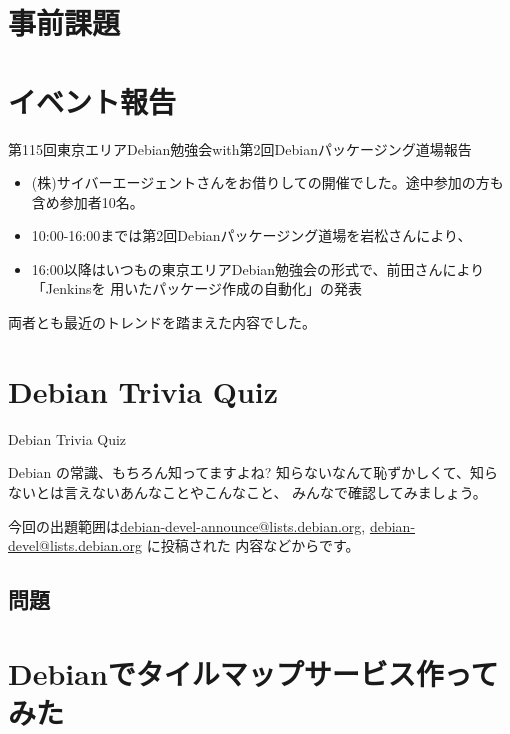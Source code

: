 \section{事前課題}
{\footnotesize

}

\section{イベント報告}

\begin{frame}{第115回東京エリアDebian勉強会with第2回Debianパッケージング道場報告}
 
\begin{itemize}
\item  (株)サイバーエージェントさんをお借りしての開催でした。途中参加の方も含め参加者10名。
\item 10:00-16:00までは第2回Debianパッケージング道場を岩松さんにより、
\item 16:00以降はいつもの東京エリアDebian勉強会の形式で、前田さんにより「Jenkinsを
用いたパッケージ作成の自動化」の発表
\end{itemize} 

 両者とも最近のトレンドを踏まえた内容でした。
 
\end{frame}

\section{Debian Trivia Quiz}
\begin{frame}{Debian Trivia Quiz}

  Debian の常識、もちろん知ってますよね?
知らないなんて恥ずかしくて、知らないとは言えないあんなことやこんなこと、
みんなで確認してみましょう。

今回の出題範囲は\url{debian-devel-announce@lists.debian.org},
\url{debian-devel@lists.debian.org} に投稿された
内容などからです。

\end{frame}

\subsection{問題}



\section{Debianでタイルマップサービス作ってみた}

